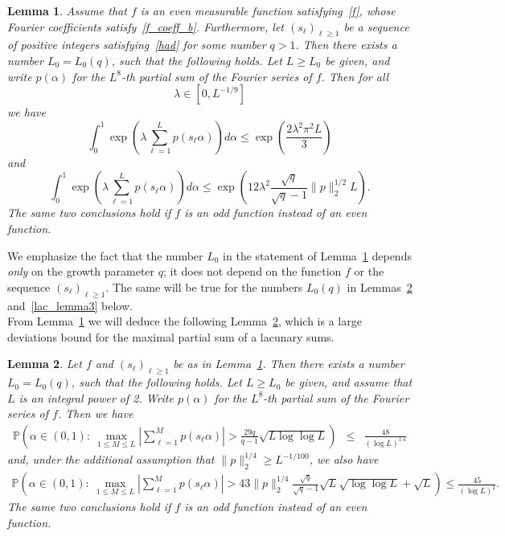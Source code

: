 \documentclass[12pt]{amsart}
\newtheorem{lemma}{Lemma}
\newcommand {\p} {\mathbb{P}}
\begin{document}
\begin{lemma} \label{lac_lemma1}
Assume that $f$ is an even measurable function satisfying~\eqref{f}, whose Fourier coefficients satisfy~\eqref{f_coeff_b}. Furthermore, let $(s_\ell)_{\ell \geq 1}$ be a sequence of positive integers satisfying~\eqref{had} for some number $q > 1$. Then there exists a number $L_0 = L_0(q)$, such that the following holds. Let $L \geq L_0$ be given, and write $p(\alpha)$ for the $L^{8}$-th partial sum of the Fourier series of $f$. Then for all 
\begin{equation} \label{lambda}
\lambda \in \left[0, L^{-1/9} \right]
\end{equation}
we have
$$
\int_0^1 \exp\left(\lambda \sum_{\ell=1}^{L} p(s_\ell \alpha) \right) d\alpha \leq \exp \left( \frac{2 \lambda^2 \pi^2 L}{3} \right)
$$
and
$$
\int_0^1 \exp\left(\lambda \sum_{\ell=1}^{L} p(s_\ell \alpha) \right) d\alpha \leq \exp \left(12 \lambda^2 \frac{\sqrt{q}}{\sqrt{q}-1} \|p\|_2^{1/2} L \right).
$$
The same two conclusions hold if $f$ is an odd function instead of an even function.
\end{lemma}
We emphasize the fact that the number $L_0$ in the statement of Lemma~\ref{lac_lemma1} depends \emph{only} on the growth parameter $q$; it does not depend on the function $f$ or the sequence $(s_\ell)_{\ell \geq 1}$. The same will be true for the numbers $L_0(q)$ in Lemmas~\ref{lac_lemma1a} and~\ref{lac_lemma3} below.\\

From Lemma~\ref{lac_lemma1} we will deduce the following Lemma~\ref{lac_lemma1a}, which is a large deviations bound for the maximal partial sum of a lacunary sums.

\begin{lemma} \label{lac_lemma1a}
Let $f$ and $(s_\ell)_{\ell \geq 1}$ be as in Lemma~\ref{lac_lemma1}. Then there exists a number $L_0 = L_0(q)$, such that the following holds. Let $L \geq L_0$ be given, and assume that $L$ is an integral power of 2. Write $p(\alpha)$ for the $L^{8}$-th partial sum of the Fourier series of $f$. Then we have
\begin{eqnarray*}
\p \left( \alpha \in (0,1):~\max_{1 \leq M \leq L} \left| \sum_{\ell=1}^M p(s_\ell \alpha) \right| > \frac{29 q}{q-1} \sqrt{L \log \log L} \right) & \leq & \frac{48}{(\log L)^{1.4}}
\end{eqnarray*}
and, under the additional assumption that $\|p\|_2^{1/4} \geq L^{-1/100}$, we also have
\begin{eqnarray*}
\p \left( \alpha \in (0,1):~\max_{1 \leq M \leq L} \left| \sum_{\ell=1}^M p(s_\ell \alpha) \right| > 43 \|p\|_2^{1/4} \frac{\sqrt{q}}{\sqrt{q}-1} \sqrt{L} \sqrt{\log \log L} + \sqrt{L} \right) \leq \frac{45}{(\log L)^2}.
\end{eqnarray*}
The same two conclusions hold if $f$ is an odd function instead of an even function.
\end{lemma}
\end{document}
